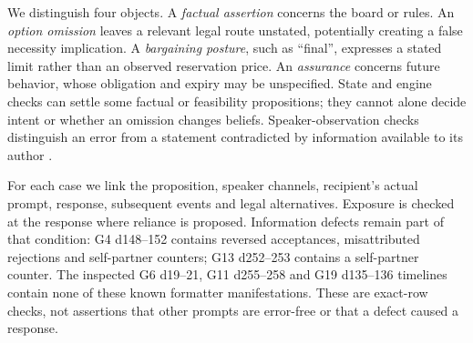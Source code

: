 We distinguish four objects. A \emph{factual assertion} concerns the board or rules. An \emph{option omission} leaves a relevant legal route unstated, potentially creating a false necessity implication. A \emph{bargaining posture}, such as ``final'', expresses a stated limit rather than an observed reservation price. An \emph{assurance} concerns future behavior, whose obligation and expiry may be unspecified. State and engine checks can settle some factual or feasibility propositions; they cannot alone decide intent or whether an omission changes beliefs. Speaker-observation checks distinguish an error from a statement contradicted by information available to its author \citep{turpin2023unfaithful,lanham2023faithfulness}.

For each case we link the proposition, speaker channels, recipient's actual prompt, response, subsequent events and legal alternatives. Exposure is checked at the response where reliance is proposed. Information defects remain part of that condition: G4 d148--152 contains reversed acceptances, misattributed rejections and self-partner counters; G13 d252--253 contains a self-partner counter. The inspected G6 d19--21, G11 d255--258 and G19 d135--136 timelines contain none of these known formatter manifestations. These are exact-row checks, not assertions that other prompts are error-free or that a defect caused a response.

